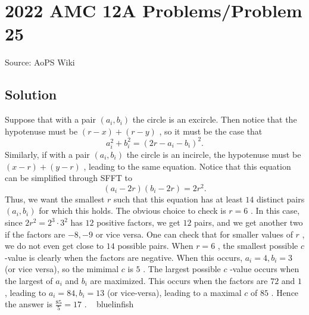 \documentclass[12pt]{article}
\begin{document}
\section*{{2022 AMC 12A Problems/Problem 25}}
Source: AoPS Wiki

\subsection*{Solution}
Suppose that with a pair $(a_i,b_i)$ the circle is an excircle. Then notice that the hypotenuse must be $(r-x)+(r-y)$ , so it must be the case that \[a_i^2+b_i^2=(2r-a_i-b_i)^2.\] Similarly, if with a pair $(a_i,b_i)$ the circle is an incircle, the hypotenuse must be $(x-r)+(y-r)$ , leading to the same equation. Notice that this equation can be simplified through SFFT to \[(a_i-2r)(b_i-2r)=2r^2.\] Thus, we want the smallest $r$ such that this equation has at least $14$ distinct pairs $(a_i,b_i)$ for which this holds. The obvious choice to check is $r=6$ . In this case, since $2r^2=2^3\cdot 3^2$ has $12$ positive factors, we get $12$ pairs, and we get another two if the factors are $-8,-9$ or vice versa. One can check that for smaller values of $r$ , we do not even get close to $14$ possible pairs. When $r=6$ , the smallest possible $c$ -value is clearly when the factors are negative. When this occurs, $a_i=4, b_i=3$ (or vice versa), so the mimimal $c$ is $5$ . The largest possible $c$ -value occurs when the largest of $a_i$ and $b_i$ are maximized. This occurs when the factors are $72$ and $1$ , leading to $a_i=84, b_i=13$ (or vice-versa), leading to a maximal $c$ of $85$ . Hence the answer is $\frac{85}5=\boxed{17}$ . ~ bluelinfish
\end{document}
